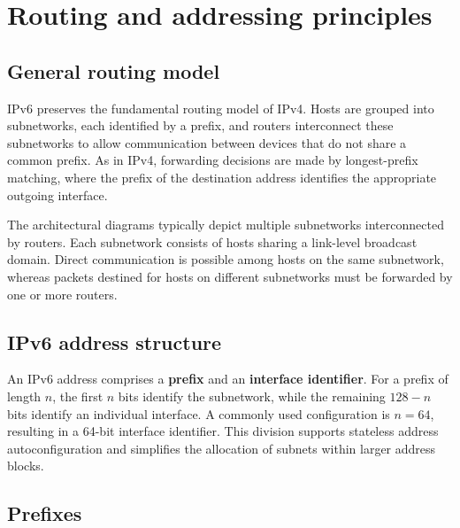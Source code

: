 \section{Routing and addressing principles}

\subsection{General routing model}

IPv6 preserves the fundamental routing model of IPv4. Hosts are grouped into subnetworks, each identified by a prefix, and routers interconnect these subnetworks to allow communication between devices that do not share a common prefix. As in IPv4, forwarding decisions are made by longest-prefix matching, where the prefix of the destination address identifies the appropriate outgoing interface.

The architectural diagrams typically depict multiple subnetworks interconnected by routers. Each subnetwork consists of hosts sharing a link-level broadcast domain. Direct communication is possible among hosts on the same subnetwork, whereas packets destined for hosts on different subnetworks must be forwarded by one or more routers.

\begin{center}
\end{center}

\subsection{IPv6 address structure}

An IPv6 address comprises a \textbf{prefix} and an \textbf{interface identifier}. For a prefix of length $n$, the first $n$ bits identify the subnetwork, while the remaining $128 - n$ bits identify an individual interface. A commonly used configuration is $n = 64$, resulting in a 64-bit interface identifier. This division supports stateless address autoconfiguration and simplifies the allocation of subnets within larger address blocks.

\begin{center}
\end{center}

\subsection{Prefixes}

